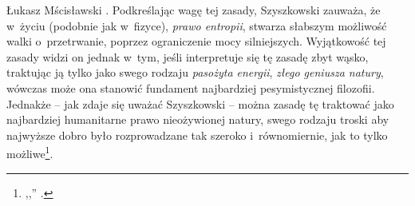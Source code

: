 \begin{artplenv}{Łukasz Mścisławski}
\parencite[por.][s.~32–33]{szyszkowski_1909}.%
 Podkreślając wagę tej zasady, Szyszkowski zauważa, że w~życiu (podobnie jak w~fizyce), \textit{prawo entropii}, stwarza słabszym możliwość walki o~przetrwanie, poprzez ograniczenie mocy silniejszych. Wyjątkowość tej zasady widzi on jednak w~tym, jeśli interpretuje się tę zasadę zbyt wąsko, traktując ją tylko jako swego rodzaju \textit{pasożyta energii}, \textit{złego geniusza natury}, wówczas może ona stanowić fundament najbardziej pesymistycznej filozofii. Jednakże -- jak zdaje się uważać Szyszkowski -- można zasadę tę traktować jako najbardziej humanitarne prawo nieożywionej natury, swego rodzaju troski aby najwyższe dobro było rozprowadzane tak szeroko i~równomiernie, jak to tylko możliwe\footnote{,,'' 
\parencite[][s.~33]{szyszkowski_1909}.}.


\end{artplenv}
